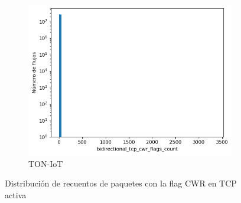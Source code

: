 \begin{figure}[H]
    \begin{subfigure}[b]{0.32\textwidth}
        \centering
        \includegraphics[width=\linewidth]{media/packet_pincer_toniot/bidirectional_tcp_cwr_flags_count_linear_x_log_y.png}
        \caption{TON-IoT}
    \end{subfigure}
       \caption{Distribución de recuentos de paquetes con la flag CWR en TCP activa}
       \label{fig:packet_pincer_bidirectional_tcp_cwr_flags_count}
\end{figure}

